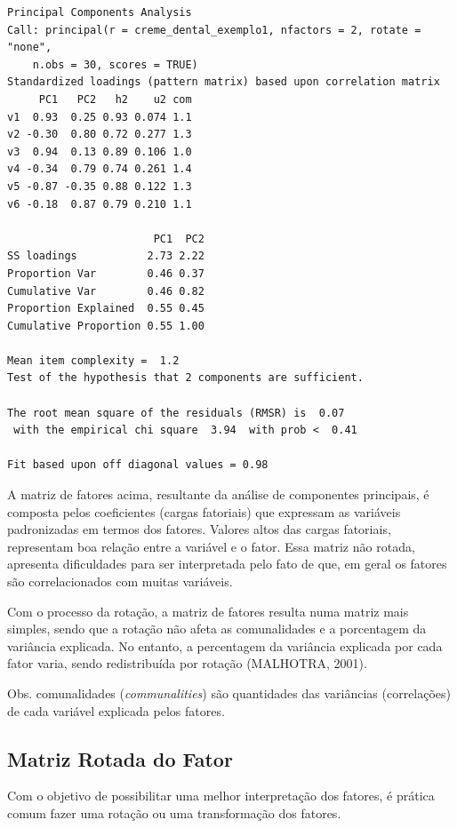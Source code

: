 \documentclass[12pt,brazil,oneside]{book}
\begin{document}
\begin{verbatim}
Principal Components Analysis
Call: principal(r = creme_dental_exemplo1, nfactors = 2, rotate = "none", 
    n.obs = 30, scores = TRUE)
Standardized loadings (pattern matrix) based upon correlation matrix
     PC1   PC2   h2    u2 com
v1  0.93  0.25 0.93 0.074 1.1
v2 -0.30  0.80 0.72 0.277 1.3
v3  0.94  0.13 0.89 0.106 1.0
v4 -0.34  0.79 0.74 0.261 1.4
v5 -0.87 -0.35 0.88 0.122 1.3
v6 -0.18  0.87 0.79 0.210 1.1

                       PC1  PC2
SS loadings           2.73 2.22
Proportion Var        0.46 0.37
Cumulative Var        0.46 0.82
Proportion Explained  0.55 0.45
Cumulative Proportion 0.55 1.00

Mean item complexity =  1.2
Test of the hypothesis that 2 components are sufficient.

The root mean square of the residuals (RMSR) is  0.07 
 with the empirical chi square  3.94  with prob <  0.41 

Fit based upon off diagonal values = 0.98
\end{verbatim}

A matriz de fatores acima, resultante da análise de componentes
principais, é composta pelos coeficientes (cargas fatoriais) que
expressam as variáveis padronizadas em termos dos fatores. Valores altos
das cargas fatoriais, representam boa relação entre a variável e o
fator. Essa matriz não rotada, apresenta dificuldades para ser
interpretada pelo fato de que, em geral os fatores são correlacionados
com muitas variáveis.

Com o processo da rotação, a matriz de fatores resulta numa matriz mais
simples, sendo que a rotação não afeta as comunalidades e a porcentagem
da variância explicada. No entanto, a percentagem da variância explicada
por cada fator varia, sendo redistribuída por rotação (MALHOTRA, 2001).

Obs. comunalidades (\emph{communalities}) são quantidades das variâncias
(correlações) de cada variável explicada pelos fatores.

\hypertarget{matriz-rotada-do-fator}{%
\subsection{Matriz Rotada do Fator}\label{matriz-rotada-do-fator}}

Com o objetivo de possibilitar uma melhor interpretação dos fatores, é
prática comum fazer uma rotação ou uma transformação dos fatores.
\end{document}

